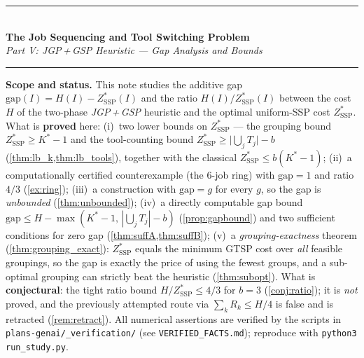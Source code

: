 \documentclass[11pt,a4paper]{article}
\theoremstyle{plain}
\theoremstyle{definition}
\newcommand{\Kstar}{K^{*}}
\newcommand{\ZSSP}{Z_{\mathrm{SSP}}^{*}}
\begin{document}

\begin{center}
  {\color{navyblue}\rule{\textwidth}{2pt}}\\[0.4cm]
  {\LARGE\bfseries\color{navyblue}The Job Sequencing and Tool Switching Problem}\\[0.3cm]
  {\large\itshape\color{midblue}Part V: JGP\,+\,GSP Heuristic --- Gap Analysis and Bounds}\\[0.2cm]
  {\color{navyblue}\rule{\textwidth}{2pt}}
\end{center}

\begin{mdframed}[backgroundcolor=lightblue,linecolor=navyblue,linewidth=1pt,
  innerleftmargin=14pt,innerrightmargin=14pt,innertopmargin=8pt,innerbottommargin=8pt]
\small\textbf{Scope and status.}
This note studies the additive gap $\mathrm{gap}(I)=H(I)-\ZSSP(I)$ and the ratio
$H(I)/\ZSSP(I)$ between the cost $H$ of the two-phase \emph{JGP\,+\,GSP} heuristic
and the optimal uniform-SSP cost $\ZSSP$. What is \textbf{proved} here:
(i)~two lower bounds on $\ZSSP$ --- the grouping bound $\ZSSP\ge\Kstar-1$ and the
tool-counting bound $\ZSSP\ge\bigl|\bigcup_jT_j\bigr|-b$ (\cref{thm:lb_k,thm:lb_tools}),
together with the classical $\ZSSP\le b(\Kstar-1)$;
(ii)~a computationally certified counterexample (the $6$-job ring) with
$\mathrm{gap}=1$ and ratio $4/3$ (\cref{ex:ring});
(iii)~a construction with $\mathrm{gap}=g$ for every $g$, so the gap is
\emph{unbounded} (\cref{thm:unbounded});
(iv)~a directly computable gap bound $\mathrm{gap}\le H-\max(\Kstar-1,\,|\bigcup_jT_j|-b)$
(\cref{prop:gapbound}) and two sufficient conditions for zero gap (\cref{thm:suffA,thm:suffB});
(v)~a \emph{grouping-exactness} theorem (\cref{thm:grouping_exact}): $\ZSSP$ equals the
minimum GTSP cost over \emph{all} feasible groupings, so the gap is exactly the price of
using the fewest groups, and a sub-optimal grouping can strictly beat the heuristic
(\cref{thm:subopt}).
What is \textbf{conjectural}: the tight ratio bound $H/\ZSSP\le 4/3$ for $b=3$
(\cref{conj:ratio}); it is \emph{not} proved, and the previously attempted route
via $\sum_kR_k\le H/4$ is false and is retracted (\cref{rem:retract}).
All numerical assertions are verified by the scripts in
\texttt{plans-genai/\_verification/} (see \texttt{VERIFIED\_FACTS.md}); reproduce with
\texttt{python3 run\_study.py}.
\end{mdframed}

\vspace{0.4cm}
\tableofcontents
\newpage
\end{document}
